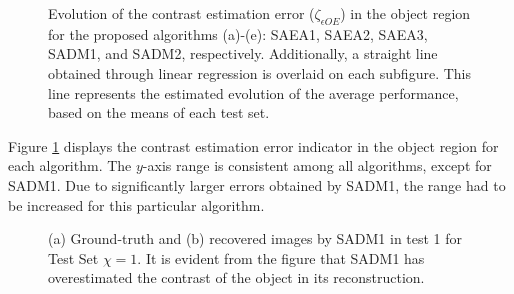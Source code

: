 \begin{figure}
				\caption[Evolution of contrast estimation error in the object region for the proposed algorithms in benchmark study.]{Evolution of the contrast estimation error ($\zeta_{\epsilon OE}$) in the object region for the proposed algorithms (a)-(e): SAEA1, SAEA2, SAEA3, SADM1, and SADM2, respectively. Additionally, a straight line obtained through linear regression is overlaid on each subfigure. This line represents the estimated evolution of the average performance, based on the means of each test set.}
				\label{fig:results:benchmark:zetaeoe}
			\end{figure}
		
			Figure \ref{fig:results:benchmark:zetaeoe} displays the contrast estimation error indicator in the object region for each algorithm. The $y$-axis range is consistent among all algorithms, except for SADM1. Due to significantly larger errors obtained by SADM1, the range had to be increased for this particular algorithm.
		
			\begin{figure}
				\centering
				 \hspace{0.01\textwidth}
				\caption[Ground-truth and recovered images by SADM1 in test 1 for Test Set $\chi=1$.]{(a) Ground-truth and (b) recovered images by SADM1 in test 1 for Test Set $\chi=1$. It is evident from the figure that SADM1 has overestimated the contrast of the object in its reconstruction.}
				\label{fig:results:benchmark:reconstruction}
			\end{figure}
		

